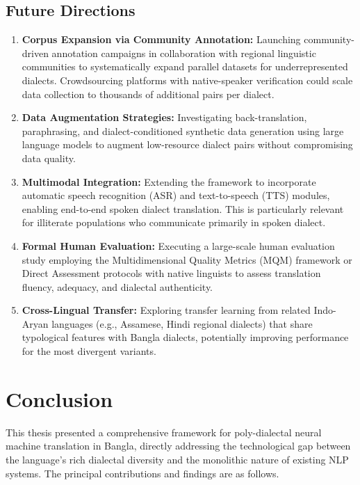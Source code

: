 \documentclass[12pt,a4paper]{article}
\begin{document}
\subsection{Future Directions}
\begin{enumerate}[leftmargin=*]
    \item \textbf{Corpus Expansion via Community Annotation:} Launching community-driven annotation campaigns in collaboration with regional linguistic communities to systematically expand parallel datasets for underrepresented dialects. Crowdsourcing platforms with native-speaker verification could scale data collection to thousands of additional pairs per dialect.
    \item \textbf{Data Augmentation Strategies:} Investigating back-translation, paraphrasing, and dialect-conditioned synthetic data generation using large language models to augment low-resource dialect pairs without compromising data quality.
    \item \textbf{Multimodal Integration:} Extending the framework to incorporate automatic speech recognition (ASR) and text-to-speech (TTS) modules, enabling end-to-end spoken dialect translation. This is particularly relevant for illiterate populations who communicate primarily in spoken dialect.
    \item \textbf{Formal Human Evaluation:} Executing a large-scale human evaluation study employing the Multidimensional Quality Metrics (MQM) framework or Direct Assessment protocols with native linguists to assess translation fluency, adequacy, and dialectal authenticity.
    \item \textbf{Cross-Lingual Transfer:} Exploring transfer learning from related Indo-Aryan languages (e.g., Assamese, Hindi regional dialects) that share typological features with Bangla dialects, potentially improving performance for the most divergent variants.
\end{enumerate}

\newpage

\section{Conclusion}

This thesis presented a comprehensive framework for poly-dialectal neural machine translation in Bangla, directly addressing the technological gap between the language's rich dialectal diversity and the monolithic nature of existing NLP systems. The principal contributions and findings are as follows.
\end{document}
